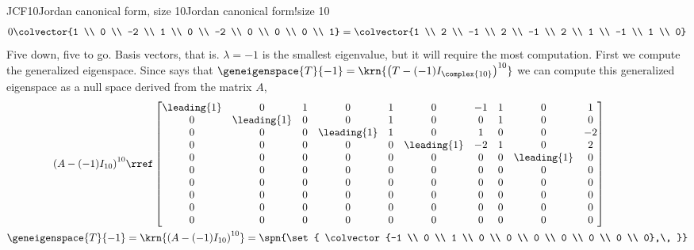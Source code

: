 \begin{example}{JCF10}{Jordan canonical form, size 10}{Jordan canonical form!size 10}
\begin{align*}
0\colvector{1 \\ 0 \\ -2 \\ 1 \\ 0 \\ -2 \\ 0 \\ 0 \\ 0 \\ 1}
=
\colvector{1 \\ 2 \\ -1 \\ 2 \\ -1 \\ 2 \\ 1 \\ -1 \\ 1 \\ 0}
%
\end{align*}
%
Five down, five to go.  Basis vectors, that is.  $\lambda=-1$ is the smallest eigenvalue, but it will require the most computation.  First we compute the generalized eigenspace.  Since  says that $\geneigenspace{T}{-1}=\krn{\left(T-(-1)I_{\complex{10}}\right)^{10}}$ we can compute this generalized eigenspace as a null space derived from the matrix $A$,
%
\begin{align*}
\left(A-(-1)I_{10}\right)^{10}
&\rref
\begin{bmatrix}
 \leading{1} & 0 & 1 & 0 & 1 & 0 & -1 & 1 & 0 & 1 \\
 0 & \leading{1} & 0 & 0 & 1 & 0 & 0 & 1 & 0 & 0 \\
 0 & 0 & 0 & \leading{1} & 1 & 0 & 1 & 0 & 0 & -2 \\
 0 & 0 & 0 & 0 & 0 & \leading{1} & -2 & 1 & 0 & 2 \\
 0 & 0 & 0 & 0 & 0 & 0 & 0 & 0 & \leading{1} & 0 \\
 0 & 0 & 0 & 0 & 0 & 0 & 0 & 0 & 0 & 0 \\
 0 & 0 & 0 & 0 & 0 & 0 & 0 & 0 & 0 & 0 \\
 0 & 0 & 0 & 0 & 0 & 0 & 0 & 0 & 0 & 0 \\
 0 & 0 & 0 & 0 & 0 & 0 & 0 & 0 & 0 & 0 \\
 0 & 0 & 0 & 0 & 0 & 0 & 0 & 0 & 0 & 0
\end{bmatrix}\\
\geneigenspace{T}{-1}&=\krn{\left(A-(-1)I_{10}\right)^{10}}=
\spn{\set{
\colvector{-1 \\ 0 \\ 1 \\ 0 \\ 0 \\ 0 \\ 0 \\ 0 \\ 0 \\ 0},\,
}}
\end{align*}
\end{example}
